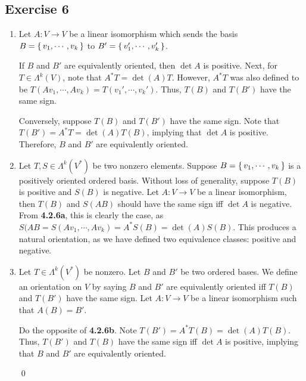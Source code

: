 \documentclass{article}
\begin{document}
  \subsection*{Exercise 6}
    \begin{enumerate}[label=\textbf{(\alph*)}]
      \item{
        Let $A\colon V\to V$ be a linear isomorphism which sends the basis
        $B=\set{v_1,\cdots,v_k}$ to $B'=\set{v_1',\cdots,v_k'}$.

        If $B$ and $B'$ are equivalently oriented, then $\det A$ is positive.
        Next, for $T\in\Lambda^k(V)$, note that $A^*T=\det(A)T$. However, $A^*T$
        was also defined to be $T(Av_1,\cdots,Av_k)=T(v_1',\cdots,v_k')$. Thus,
        $T(B)$ and $T(B')$ have the same sign.

        Conversely, suppose $T(B)$ and $T(B')$ have the same sign. Note that
        $T(B')=A^*T=\det(A)T(B)$, implying that $\det A$ is positive. Therefore,
        $B$ and $B'$ are equivalently oriented.
      }
      \item{
        Let $T,S\in\Lambda^k(V^*)$ be two nonzero elements. Suppose $B=\set{v_1,
        \cdots,v_k}$ is a positively oriented ordered basis. Without loss of
        generality, suppose $T(B)$ is positive and $S(B)$ is negative. Let $A
        \colon V\to V$ be a linear isomorphism, then $T(B)$ and $S(AB)$ should
        have the same sign iff $\det A$ is negative. From \textbf{4.2.6a}, this
        is clearly the case, as $S(AB=S(Av_1,\cdots,Av_k)=A^*S(B)=\det(A)S(B)
        $. This produces a natural orientation, as we have defined two
        equivalence classes: positive and negative.
      }
      \item{
        Let $T\in\Lambda^k(V^*)$ be nonzero. Let $B$ and $B'$ be two ordered
        bases. We define an orientation on $V$ by saying $B$ and $B'$ are
        equivalently oriented iff $T(B)$ and $T(B')$ have the same sign. Let
        $A\colon V\to V$ be a linear isomorphism such that $A(B)=B'$.

        Do the opposite of \textbf{4.2.6b}. Note $T(B')=A^*T(B)=\det(A)T(B)$.
        Thus, $T(B')$ and $T(B)$ have the same sign iff $\det A$ is positive,
        implying that $B$ and $B'$ are equivalently oriented.
      }
      \qed
    \end{enumerate}
\end{document}

